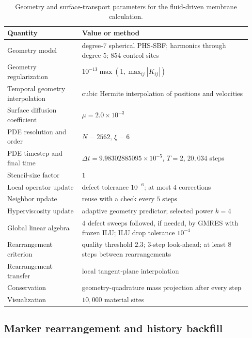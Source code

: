 \documentclass[a4paper,fleqn]{cas-sc}
\begin{document}
\begin{table}[p]
\centering
\caption{Geometry and surface-transport parameters for the fluid-driven
membrane calculation.}
\label{tab:rbc-surface-parameters}
\small
\setlength{\tabcolsep}{5pt}
\begin{tabular}{p{} p{}}
\toprule
Quantity & Value or method \\
\midrule
Geometry model & degree-\(7\) spherical PHS-SBF; harmonics through degree \(5\);
  \(854\) control sites \\
Geometry regularization &
  \(10^{-13}\max(1,\max_{ij}|K_{ij}|)\) \\
Temporal geometry interpolation & cubic Hermite interpolation of positions
  and velocities \\
Surface diffusion coefficient & \(\mu=2.0\times10^{-3}\) \\
PDE resolution and order & \(N=2562\), \(\xi=6\) \\
PDE timestep and final time & \(\Delta t=9.98302885095\times10^{-5}\),
  \(T=2\), \(20{,}034\) steps \\
Stencil-size factor & \(1\) \\
Local operator update & defect tolerance \(10^{-6}\); at most \(4\) corrections \\
Neighbor update & reuse with a check every \(5\) steps \\
Hyperviscosity update & adaptive geometry predictor; selected power \(k=4\) \\
Global linear algebra & \(4\) defect sweeps followed, if needed, by GMRES with
  frozen ILU; ILU drop tolerance \(10^{-4}\) \\
Rearrangement criterion & quality threshold \(2.3\); \(3\)-step look-ahead; at least
  \(8\) steps between rearrangements \\
Rearrangement transfer & local tangent-plane interpolation \\
Conservation & geometry-quadrature mass projection after every step \\
Visualization & \(10{,}000\) material sites \\
\bottomrule
\end{tabular}
\end{table}

\subsection{Marker rearrangement and history backfill}
\label{subsec:rearrangement-results}
\end{document}
